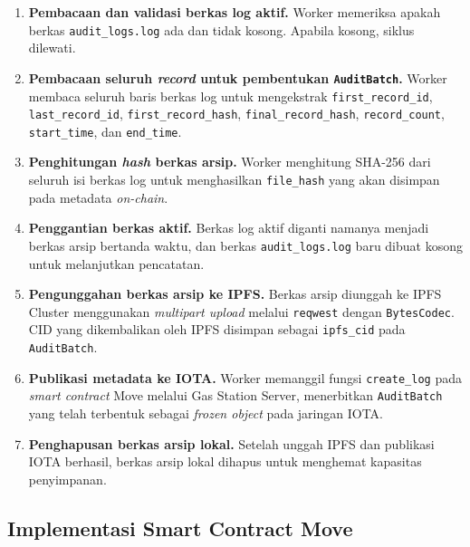 \begin{enumerate}
    \item \textbf{Pembacaan dan validasi berkas log aktif.} Worker memeriksa
    apakah berkas \texttt{audit\_logs.log} ada dan tidak kosong. Apabila kosong,
    siklus dilewati.

    \item \textbf{Pembacaan seluruh \textit{record} untuk pembentukan
    \texttt{AuditBatch}.} Worker membaca seluruh baris berkas log untuk
    mengekstrak \texttt{first\_record\_id}, \texttt{last\_record\_id},
    \texttt{first\_record\_hash}, \texttt{final\_record\_hash},
    \texttt{record\_count}, \texttt{start\_time}, dan \texttt{end\_time}.

    \item \textbf{Penghitungan \textit{hash} berkas arsip.} Worker menghitung
    SHA-256 dari seluruh isi berkas log untuk menghasilkan \texttt{file\_hash}
    yang akan disimpan pada metadata \textit{on-chain}.

    \item \textbf{Penggantian berkas aktif.} Berkas log aktif diganti namanya
    menjadi berkas arsip bertanda waktu, dan berkas \texttt{audit\_logs.log}
    baru dibuat kosong untuk melanjutkan pencatatan.

    \item \textbf{Pengunggahan berkas arsip ke IPFS.} Berkas arsip diunggah
    ke IPFS Cluster menggunakan \textit{multipart upload} melalui \texttt{reqwest}
    dengan \texttt{BytesCodec}. CID yang dikembalikan oleh IPFS disimpan sebagai
    \texttt{ipfs\_cid} pada \texttt{AuditBatch}.

    \item \textbf{Publikasi metadata ke IOTA.} Worker memanggil fungsi
    \texttt{create\_log} pada \textit{smart contract} Move melalui Gas Station
    Server, menerbitkan \texttt{AuditBatch} yang telah terbentuk sebagai
    \textit{frozen object} pada jaringan IOTA.

    \item \textbf{Penghapusan berkas arsip lokal.} Setelah unggah IPFS dan
    publikasi IOTA berhasil, berkas arsip lokal dihapus untuk menghemat
    kapasitas penyimpanan.
\end{enumerate}

\subsection{Implementasi Smart Contract Move}

